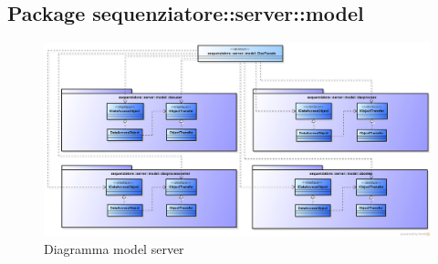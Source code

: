 \subsection{Package sequenziatore::server::model}
\begin{figure}[H] \centering \includegraphics[width=%
\textwidth]
{./pack/ClassiServerSoloModel.png} \caption{Diagramma model server}
\end{figure}
